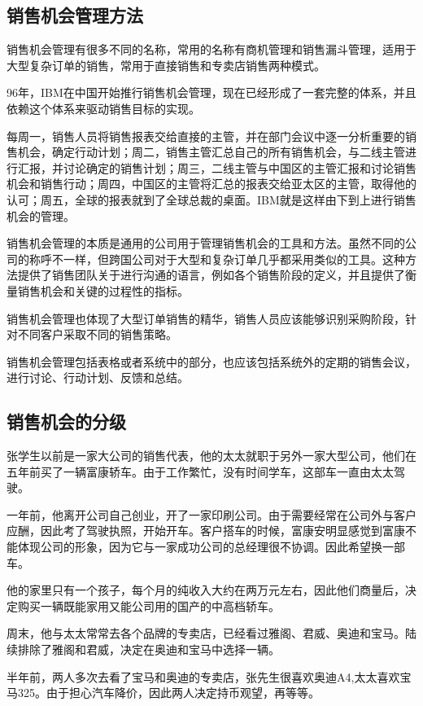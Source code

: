 \subsection {销售机会管理方法}

    销售机会管理有很多不同的名称，常用的名称有商机管理和销售漏斗管理，适用于大型复杂订单的销售，常用于直接销售和专卖店销售两种模式。

    96年，IBM在中国开始推行销售机会管理，现在已经形成了一套完整的体系，并且依赖这个体系来驱动销售目标的实现。

    每周一，销售人员将销售报表交给直接的主管，并在部门会议中逐一分析重要的销售机会，确定行动计划；周二，销售主管汇总自己的所有销售机会，与二线主管进行汇报，并讨论确定的销售计划；周三，二线主管与中国区的主管汇报和讨论销售机会和销售行动；周四，中国区的主管将汇总的报表交给亚太区的主管，取得他的认可；周五，全球的报表就到了全球总裁的桌面。IBM就是这样由下到上进行销售机会的管理。

    销售机会管理的本质是通用的公司用于管理销售机会的工具和方法。虽然不同的公司的称呼不一样，但跨国公司对于大型和复杂订单几乎都采用类似的工具。这种方法提供了销售团队关于进行沟通的语言，例如各个销售阶段的定义，并且提供了衡量销售机会和关键的过程性的指标。

    销售机会管理也体现了大型订单销售的精华，销售人员应该能够识别采购阶段，针对不同客户采取不同的销售策略。

    销售机会管理包括表格或者系统中的部分，也应该包括系统外的定期的销售会议，进行讨论、行动计划、反馈和总结。

\subsection {销售机会的分级}

    张学生以前是一家大公司的销售代表，他的太太就职于另外一家大型公司，他们在五年前买了一辆富康轿车。由于工作繁忙，没有时间学车，这部车一直由太太驾驶。

    一年前，他离开公司自己创业，开了一家印刷公司。由于需要经常在公司外与客户应酬，因此考了驾驶执照，开始开车。客户搭车的时候，富康安明显感觉到富康不能体现公司的形象，因为它与一家成功公司的总经理很不协调。因此希望换一部车。

    他的家里只有一个孩子，每个月的纯收入大约在两万元左右，因此他们商量后，决定购买一辆既能家用又能公司用的国产的中高档轿车。

    周末，他与太太常常去各个品牌的专卖店，已经看过雅阁、君威、奥迪和宝马。陆续排除了雅阁和君威，决定在奥迪和宝马中选择一辆。

    半年前，两人多次去看了宝马和奥迪的专卖店，张先生很喜欢奥迪A4,太太喜欢宝马325。由于担心汽车降价，因此两人决定持币观望，再等等。

